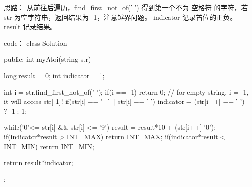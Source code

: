 思路：
从前往后遍历，find_first_not_of(' ') 得到第一个不为 空格符 的字符，若str 为空字符串，返回结果为 -1，注意越界问题。
indicator 记录首位的正负。
result 记录结果。






































code：
class Solution {
public:
    int myAtoi(string str) {
        long result = 0;
        int indicator = 1;
        
        int i = str.find_first_not_of(' ');
        if(i == -1) return 0; // for empty string, i = -1, it will access str[-1]!
        if(str[i] == '+' || str[i] == '-')
            indicator = (str[i++] == '-') ? -1 : 1;
        
        while('0'<= str[i] && str[i] <= '9')
        {
            result = result*10 + (str[i++]-'0');
            if(indicator*result > INT_MAX) return INT_MAX;
            if(indicator*result < INT_MIN) return INT_MIN;
        }
        
        return result*indicator;
    }
};